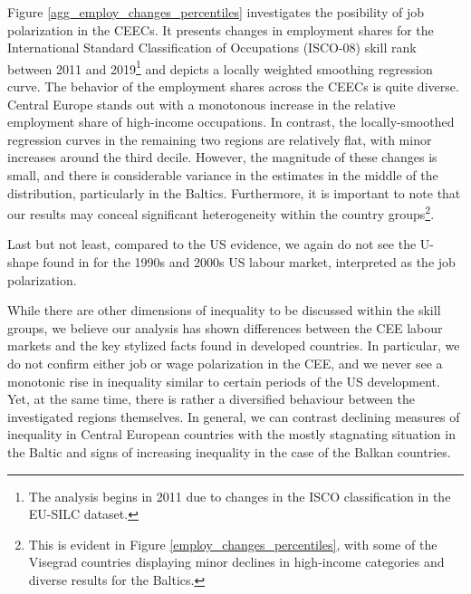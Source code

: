 \documentclass[11pt]{article}
\begin{document}
Figure \ref{agg_employ_changes_percentiles} investigates the posibility of job polarization in the CEECs. It presents changes in employment shares for the International Standard Classification of Occupations (ISCO-08) skill rank between 2011 and 2019\footnote{The analysis begins in 2011 due to changes in the ISCO classification in the EU-SILC dataset.} and depicts a locally weighted smoothing regression curve. The behavior of the employment shares across the CEECs is quite diverse. Central Europe stands out with a monotonous increase in the relative employment share of high-income occupations. In contrast, the locally-smoothed regression curves in the remaining two regions are relatively flat, with minor increases around the third decile. However, the magnitude of these changes is small, and there is considerable variance in the estimates in the middle of the distribution, particularly in the Baltics. Furthermore, it is important to note that our results may conceal significant heterogeneity within the country groups\footnote{This is evident in Figure \ref{employ_changes_percentiles}, with some of the Visegrad countries displaying minor declines in high-income categories and diverse results for the Baltics.}.

Last but not least, compared to the US evidence, we again do not see the  U-shape found in \citet{acemoglu2012does} for the 1990s and 2000s US labour market, interpreted as the job polarization.


While there are other dimensions of inequality to be discussed within the skill groups, we believe our analysis has shown differences between the CEE labour markets and the key stylized facts found in developed countries. In particular, we do not confirm either job or wage polarization in the CEE, and we never see a monotonic rise in inequality similar to certain periods of the US development. Yet, at the same time, there is rather a diversified behaviour between the investigated regions themselves. In general, we can contrast declining measures of inequality in Central European countries with the mostly stagnating situation in the Baltic and signs of increasing inequality in the case of the Balkan countries.
\end{document}
